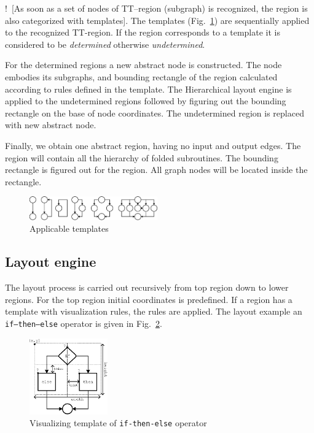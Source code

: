 \documentclass[conference]{IEEEtran}
\newcommand{\nnn}[2][ncolor]{\noindent%
\textcolor{eclr}{!\ [}\textcolor{#1}{#2}\textcolor{eclr}{]}}
\begin{document}

\nnn{As soon as a set of nodes of TT--region (subgraph) is recognized, the region is also categorized with templates}.  The templates (Fig.~\ref{fig:Regions}) are sequentially applied to the recognized TT-region.  If the region corresponds to a template it is considered to be \emph{determined} otherwise \emph{undetermined}.

For the determined regions a new abstract node is constructed.  The node embodies its subgraphs, and bounding rectangle of the region calculated according to rules defined in the template.  The Hierarchical layout engine is applied to the undetermined regions followed by figuring out the bounding rectangle on the base of node coordinates.  The undetermined region is replaced with new abstract node.

Finally, we obtain one abstract region, having no input and output edges.  The region will contain all the hierarchy of folded subroutines.  The bounding rectangle is figured out for the region.  All graph nodes will be located inside the rectangle.

\begin{figure}[htbp]
	\centering
		\includegraphics[width=0.49\textwidth]{Pic/Reg.eps}
	\caption{Applicable templates}
	\label{fig:Regions}
\end{figure}

\subsection{Layout engine}
\label{sec:raskladka-process}

The layout process is carried out recursively from top region down to lower regions.  For the top region initial coordinates is predefined.  If a region has a template with visualization rules, the rules are applied.  The layout example an \texttt{if--then--else} operator is given in Fig.~\ref{fig:IfThenElse}.

\begin{figure}[b]
	\centering
		\includegraphics[width=0.3\textwidth]{Pic/IfThenElse.eps}
	\caption{Visualizing template of \texttt{if-then-else} operator}
	\label{fig:IfThenElse}
\end{figure}
\end{document}
